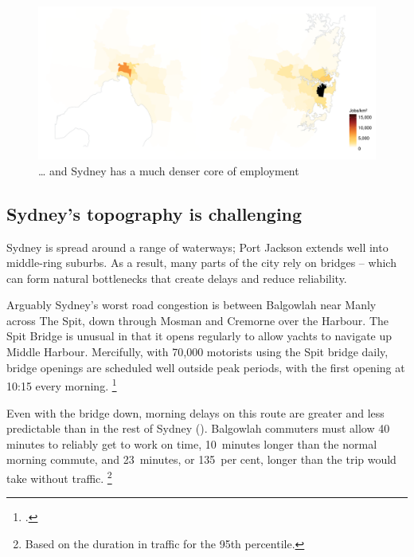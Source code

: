 \documentclass{grattan}
\begin{document}
\begin{figure}
\caption{\dots{} and Sydney has a much denser core of employment \label{fig:sydney-vs-melbourne-employment-density}}
\includegraphics[width=2.164\columnwidth]{atlas/SYD_MEL_work_densities-1.pdf}
\end{figure}


\subsection{Sydney's topography is challenging}

Sydney is spread around a range of waterways; Port Jackson extends well into middle-ring suburbs.
As a result, many parts of the city rely on bridges -- which can form natural bottlenecks that create delays and reduce reliability.

Arguably Sydney's worst road congestion is between Balgowlah near Manly across The Spit, down through Mosman and Cremorne over the Harbour.
The Spit Bridge is unusual in that it opens regularly to allow yachts to navigate up Middle Harbour.
Mercifully, with 70,000 motorists using the Spit bridge daily, bridge openings are scheduled well outside peak periods, with the first opening at 10:15 every morning. \footcite{RMS-2017-bridge-opening-times}

Even with the bridge down, morning delays on this route are greater and less predictable than in the rest of Sydney ().
Balgowlah commuters must allow 40 minutes to reliably get to work on time, 10~minutes longer than the normal morning commute, and 23~minutes, or 135~per cent, longer than the trip would take without traffic.%
    \footnote{Based on the duration in traffic for the 95th percentile.}
\end{document}
